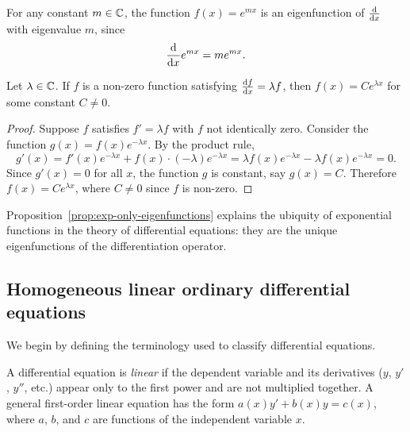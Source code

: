 \documentclass[a4paper]{article}
\begin{document}
\begin{eg}
  For any constant $m \in \mathbb{C}$, the function $f(x) = e^{mx}$ is an eigenfunction of $\frac{\mathrm{d}}{\mathrm{d} x}$ with eigenvalue $m$, since
  \[
    \frac{\mathrm{d}}{\mathrm{d} x}e^{mx} = me^{mx}.
  \]
\end{eg}

\begin{prop}\label{prop:exp-only-eigenfunctions}
  Let $\lambda \in \mathbb{C}$. If $f$ is a non-zero function satisfying $\frac{\mathrm{d} f}{\mathrm{d} x} = \lambda f$, then $f(x) = Ce^{\lambda x}$ for some constant $C \neq 0$.
\end{prop}

\begin{proof}
  Suppose $f$ satisfies $f' = \lambda f$ with $f$ not identically zero. Consider the function $g(x) = f(x) e^{-\lambda x}$. By the product rule,
  \[
    g'(x) = f'(x) e^{-\lambda x} + f(x) \cdot (-\lambda) e^{-\lambda x} = \lambda f(x) e^{-\lambda x} - \lambda f(x) e^{-\lambda x} = 0.
  \]
  Since $g'(x) = 0$ for all $x$, the function $g$ is constant, say $g(x) = C$. Therefore $f(x) = Ce^{\lambda x}$, where $C \neq 0$ since $f$ is non-zero.
\end{proof}

\begin{remark}
  Proposition~\ref{prop:exp-only-eigenfunctions} explains the ubiquity of exponential functions in the theory of differential equations: they are the unique eigenfunctions of the differentiation operator.
\end{remark}

\subsection{Homogeneous linear ordinary differential equations}

\begin{remark}
  We begin by defining the terminology used to classify differential equations.
\end{remark}

\begin{defi}
  A differential equation is \emph{linear} if the dependent variable and its derivatives ($y$, $y'$, $y''$, etc.) appear only to the first power and are not multiplied together. A general first-order linear equation has the form $a(x)y' + b(x)y = c(x)$, where $a$, $b$, and $c$ are functions of the independent variable $x$.
\end{defi}
\end{document}
